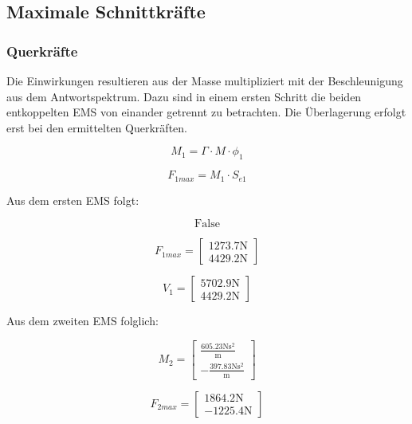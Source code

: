 \documentclass[
  letterpaper,
  DIV=11]{scrreprt}
\begin{document}
\hypertarget{maximale-schnittkruxe4fte}{%
\subsection{Maximale Schnittkräfte}\label{maximale-schnittkruxe4fte}}

\hypertarget{querkruxe4fte}{%
\subsubsection{Querkräfte}\label{querkruxe4fte}}

Die Einwirkungen resultieren aus der Masse multipliziert mit der
Beschleunigung aus dem Antwortspektrum. Dazu sind in einem ersten
Schritt die beiden entkoppelten EMS von einander getrennt zu betrachten.
Die Überlagerung erfolgt erst bei den ermittelten Querkräften.

\[
M_1 = \Gamma \cdot M \cdot \phi_1
\]

\[
F_{1max} = M_1 \cdot S_{e1}
\]

Aus dem ersten EMS folgt:

\begin{equation*}\text{False}\end{equation*}

\begin{equation*}F_{1 max} = \left[\begin{matrix}1273.7 \text{N}\\4429.2 \text{N}\end{matrix}\right]\end{equation*}

\begin{equation*}V_{1} = \left[\begin{matrix}5702.9 \text{N}\\4429.2 \text{N}\end{matrix}\right]\end{equation*}

Aus dem zweiten EMS folglich:

\begin{equation*}M_{2} = \left[\begin{matrix}\frac{605.23 \text{N} \text{s}^{2}}{\text{m}}\\- \frac{397.83 \text{N} \text{s}^{2}}{\text{m}}\end{matrix}\right]\end{equation*}

\begin{equation*}F_{2 max} = \left[\begin{matrix}1864.2 \text{N}\\- 1225.4 \text{N}\end{matrix}\right]\end{equation*}
\end{document}
